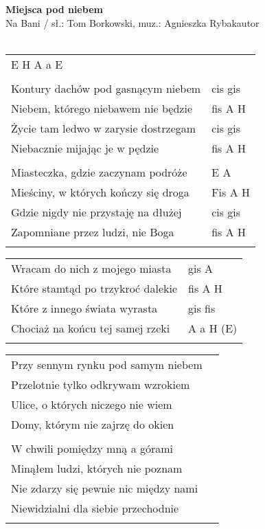 \documentclass[a5paper]{article}
\begin{document}


\noindent
\fontsize{12pt}{15pt}\selectfont
\textbf{Miejsca pod niebem} \\
\fontsize{8pt}{10pt}\selectfont
Na Bani / sł.: Tom Borkowski, muz.: Agnieszka Rybakautor \\ \\
\fontsize{10pt}{12pt}\selectfont
{}
\begin{tabular}{@{}p{8.50cm}p{3cm}@{}}
\noindent
E H A a E \\ \\

Kontury dachów pod gasnącym niebem & cis gis \\
Niebem, którego niebawem nie będzie & fis A H \\
Życie tam ledwo w zarysie dostrzegam & cis gis \\
Niebacznie mijając je w pędzie & fis A H \\ \\

Miasteczka, gdzie zaczynam podróże & E A \\
Mieściny, w których kończy się droga & Fis A H \\
Gdzie nigdy nie przystaję na dłużej & cis gis \\
Zapomniane przez ludzi, nie Boga & fis A H \\ \\
\end{tabular}

\noindent
\begin{tabular}{@{}p{7.50cm}p{3cm}@{}}
Wracam do nich z mojego miasta & gis A \\
Które stamtąd po trzykroć dalekie & fis A H \\
Które z innego świata wyrasta & gis fis \\
Chociaż na końcu tej samej rzeki & A a H (E) \\ \\
\end{tabular}

\noindent
\begin{tabular}{@{}p{8.50cm}p{3cm}@{}}
Przy sennym rynku pod samym niebem \\
Przelotnie tylko odkrywam wzrokiem \\
Ulice, o których niczego nie wiem \\
Domy, którym nie zajrzę do okien \\ \\

W chwili pomiędzy mną a górami \\
Minąłem ludzi, których nie poznam \\
Nie zdarzy się pewnie nic między nami \\
Niewidzialni dla siebie przechodnie \\ \\
\end{tabular}
\end{document}
